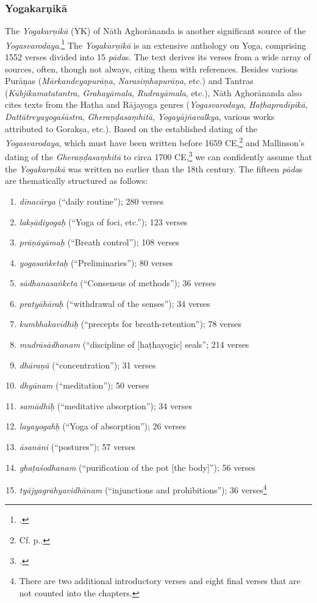 \subsubsection{Yogakarṇikā}

The \emph{Yogakarṇikā} (YK) of Nāth Aghorānanda is another significant source of the \emph{Yogasvarodaya}.\footnote{\cite{yogakarnika}.} The \emph{Yogakarṇikā} is an extensive anthology on Yoga, comprising 1552 verses divided into 15 \textit{pāda}s. The text derives its verses from a wide array of sources, often, though not always, citing them with references. Besides various Purāṇas (\emph{Mārkandeyapurāṇa}, \emph{Narasiṃhapurāṇa}, etc.) and Tantras (\textit{Kūbjikamatatantra}, \textit{Grahayāmala}, \emph{Rudrayāmala}, etc.), Nāth Aghorānanda also cites texts from the Haṭha and Rājayoga genres (\emph{Yogasvarodaya}, \emph{Haṭhapradīpikā}, \emph{Dattātreyayogaśāstra}, \emph{Gheraṇḍasaṃhitā}, \emph{Yogayājñavalkya}, various works attributed to Gorakṣa, etc.). Based on the established dating of the \emph{Yogasvarodaya}, which must have been written before 1659 CE,\footnote{Cf. p.\pageref{dating}.} and Mallinson's dating of the \emph{Gheraṇḍasaṃhitā} to circa 1700 CE,\footnote{\citeauthor[2004: xiv]{MallinsonGheranda}.} we can confidently assume that the \emph{Yogakarṇikā} was written no earlier than the 18th century.
The fifteen \textit{pāda}s are thematically structured as follows:

\begin{enumerate}
\item \textit{dinacārya} (``daily routine''); 280 verses
\item \textit{lakṣādiyogaḥ} (``Yoga of foci, etc.''); 123 verses
\item \textit{prāṇāyāmaḥ} (``Breath control''); 108 verses
\item \textit{yogasaṅketaḥ} (``Preliminaries''); 80 verses
\item \textit{sādhanasaṅketa} (``Consensus of methods''); 36 verses
\item \textit{pratyāhāraḥ} (``withdrawal of the senses''); 34 verses
\item \textit{kumbhakavidhiḥ} (``precepts for breath-retention''); 78 verses
\item \textit{mudrāsādhanam} (``discipline of [haṭhayogic] seals''; 214 verses
\item \textit{dhāraṇā} (``concentration''); 31 verses
\item \textit{dhyānam} (``meditation''); 50 verses
\item \textit{samādhiḥ} (``meditative absorption''); 34 verses
\item \textit{layayogahḥ} (``Yoga of absorption''); 26 verses
\item \textit{āsanāni} (``postures''); 57 verses
\item \textit{ghaṭaśodhanam} (``purification of the pot [the body]''); 56 verses
\item \textit{tyājyagrāhyavidhānam} (``injunctions and prohibitions''); 36 verses\footnote{There are two additional introductory verses and eight final verses that are not counted into the chapters.}
\end{enumerate}

